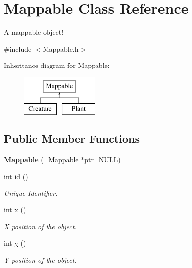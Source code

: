 \hypertarget{classMappable}{\section{\-Mappable \-Class \-Reference}
\label{classMappable}
}


\-A mappable object!  




{\ttfamily \#include $<$\-Mappable.\-h$>$}

\-Inheritance diagram for \-Mappable\-:\begin{figure}[H]
\begin{center}
\leavevmode
\includegraphics[height=2.000000cm]{classMappable}
\end{center}
\end{figure}
\subsection*{\-Public \-Member \-Functions}
\begin{DoxyCompactItemize}
\item 
\hypertarget{classMappable_abb17854ba5e1c7d295c7277498227b80}{{\bfseries \-Mappable} (\-\_\-\-Mappable $\ast$ptr=\-N\-U\-L\-L)}\label{classMappable_abb17854ba5e1c7d295c7277498227b80}

\item 
\hypertarget{classMappable_a32bdecfde44acd6ac6eaecad2a2f7c25}{int \hyperlink{classMappable_a32bdecfde44acd6ac6eaecad2a2f7c25}{id} ()}\label{classMappable_a32bdecfde44acd6ac6eaecad2a2f7c25}

\begin{DoxyCompactList}\small\item\em \-Unique \-Identifier. \end{DoxyCompactList}\item 
\hypertarget{classMappable_a5295c64e0fb8536fac76f6722f28d051}{int \hyperlink{classMappable_a5295c64e0fb8536fac76f6722f28d051}{x} ()}\label{classMappable_a5295c64e0fb8536fac76f6722f28d051}

\begin{DoxyCompactList}\small\item\em \-X position of the object. \end{DoxyCompactList}\item 
\hypertarget{classMappable_a9beaf7680b58a574d8ee102a85c2cb9e}{int \hyperlink{classMappable_a9beaf7680b58a574d8ee102a85c2cb9e}{y} ()}\label{classMappable_a9beaf7680b58a574d8ee102a85c2cb9e}

\begin{DoxyCompactList}\small\item\em \-Y position of the object. \end{DoxyCompactList}\end{DoxyCompactItemize}
